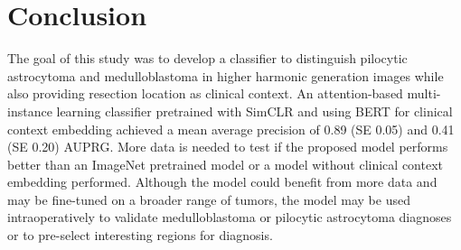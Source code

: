 \section{Conclusion}
The goal of this study was to develop a classifier to distinguish pilocytic astrocytoma and medulloblastoma in higher harmonic generation images while also providing resection location as clinical context.
An attention-based multi-instance learning classifier pretrained with SimCLR and using BERT for clinical context embedding achieved a mean average precision of \num{0.89} (SE \num{0.05}) and \num{0.41} (SE \num{0.20}) AUPRG.
More data is needed to test if the proposed model performs better than an ImageNet pretrained model or a model without clinical context embedding performed.
Although the model could benefit from more data and may be fine-tuned on a broader range of tumors, the model may be used intraoperatively to validate medulloblastoma or pilocytic astrocytoma diagnoses or to pre-select interesting regions for diagnosis.
